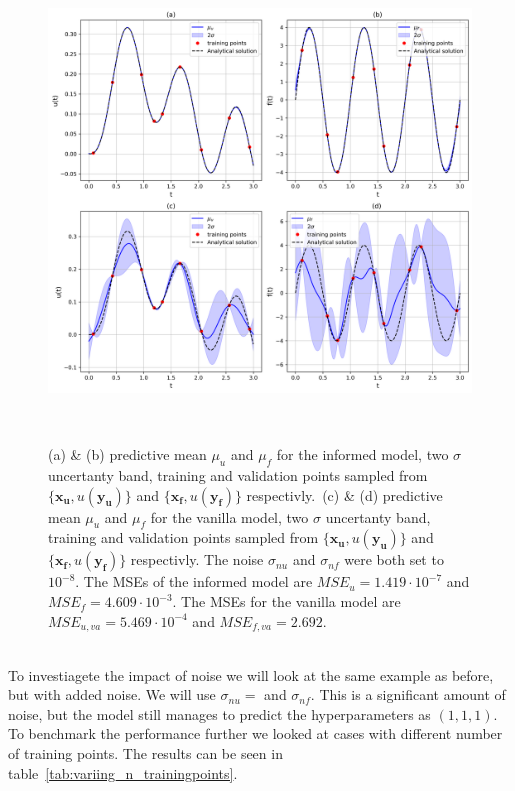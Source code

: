 \documentclass{article}
\begin{document}
\begin{figure}[htbp!]
    \centering
    \includegraphics[width=1\textwidth]{../final_examples/oscillator/merged_1d_plots.png}
    \caption{(a) \& (b) predictive mean $\mu_u$ and $\mu_f$ for the informed model, two $\sigma$ uncertanty band, training and validation points sampled from $\{\bm{x_u},u(\bm{y_u})\}$ and $\{\bm{x_f},u(\bm{y_f})\}$ respectivly.\ (c) \& (d) predictive mean $\mu_u$ and $\mu_f$ for the vanilla model, two $\sigma$ uncertanty band, training and validation points sampled from $\{\bm{x_u},u(\bm{y_u})\}$ and $\{\bm{x_f},u(\bm{y_f})\}$ respectivly. The noise $\sigma_{nu}$ and $\sigma_{nf}$ were both set to $10^{-8}$. The MSEs of the informed model are $MSE_u = 1.419 \cdot 10^{-7}$ and $MSE_f = 4.609 \cdot 10^{-3}$. The MSEs for the vanilla model are $MSE_{u,va} = 5.469 \cdot 10^{-4}$ and $MSE_{f,va} = 2.692$.}
    ~\label{fig:damped_oscillator}
\end{figure}
\\
To investiagete the impact of noise we will look at the same example as before, but with added noise. We will use $\sigma_{nu} = $ and $\sigma_{nf}$. This is a significant amount of noise, but the model still manages to predict the hyperparameters as $(1,1,1)$.
To benchmark the performance further we looked at cases with different number of training points. The results can be seen in table~\ref{tab:variing_n_trainingpoints}.
\end{document}
